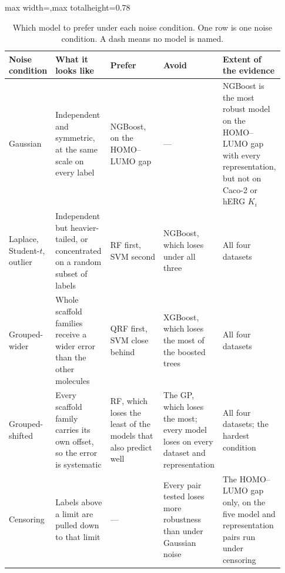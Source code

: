 \begin{table}[!htbp]
\centering
\footnotesize
\begin{adjustbox}{max width=\textwidth,max totalheight=0.78\textheight}
\begin{tabular}{@{}p{0.13\linewidth}p{0.20\linewidth}p{0.20\linewidth}p{0.20\linewidth}p{0.20\linewidth}@{}}
\toprule
Noise condition & What it looks like & Prefer & Avoid & Extent of the evidence \\
\midrule
Gaussian
& Independent and symmetric, at the same scale on every label
& NGBoost, on the HOMO--LUMO gap
& ---
& NGBoost is the most robust model on the HOMO--LUMO gap with every representation, but not on Caco-2 or hERG $K_i$ \\
\addlinespace
Laplace, Student-$t$, outlier
& Independent but heavier-tailed, or concentrated on a random subset of labels
& RF first, SVM second
& NGBoost, which loses \aucnorm{} under all three
& All four datasets \\
\addlinespace
Grouped-wider
& Whole scaffold families receive a wider error than the other molecules
& QRF first, SVM close behind
& XGBoost, which loses the most of the boosted trees
& All four datasets \\
\addlinespace
Grouped-shifted
& Every scaffold family carries its own offset, so the error is systematic
& RF, which loses the least of the models that also predict well
& The GP, which loses the most; every model loses \aucnorm{} on every dataset and representation
& All four datasets; the hardest condition \\
\addlinespace
Censoring
& Labels above a limit are pulled down to that limit
& ---
& Every pair tested loses more robustness than under Gaussian noise
& The HOMO--LUMO gap only, on the five model and representation pairs run under censoring \\
\bottomrule
\end{tabular}
\end{adjustbox}
\caption[Which model to prefer under each noise condition.]{Which model to prefer under each noise condition. One row is one noise condition. A dash means no model is named.}
\label{tab:condition_choice}
\end{table}

